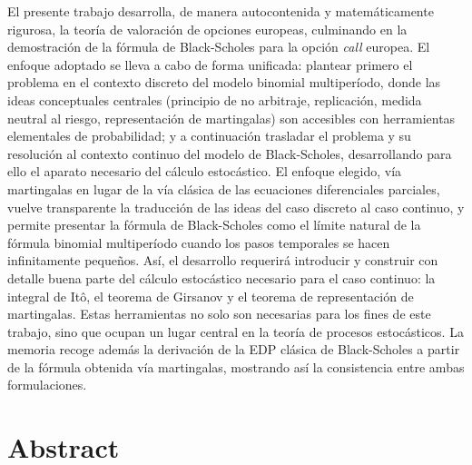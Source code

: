 \documentclass[11pt,a4paper,oneside]{report}
\theoremstyle{plain}
\theoremstyle{definition}
\theoremstyle{remark}
\newcommand{\1}{\mathbf{1}}
\begin{document}
\itshape

El presente trabajo desarrolla, de manera autocontenida y matemáticamente
rigurosa, la teoría de valoración de opciones europeas, culminando en
la demostración de la fórmula de Black-Scholes para la opción
\emph{call} europea. El enfoque adoptado se lleva a cabo de forma unificada:
plantear primero el problema en el contexto discreto del modelo
binomial multiperíodo, donde las ideas conceptuales centrales
(principio de no arbitraje, replicación, medida neutral al riesgo,
representación de martingalas) son accesibles con herramientas
elementales de probabilidad; y a continuación trasladar el problema y
su resolución al contexto continuo del modelo de Black-Scholes,
desarrollando para ello el aparato necesario del cálculo estocástico.
El enfoque elegido, vía martingalas en lugar de la vía clásica
de las ecuaciones diferenciales parciales, vuelve transparente la
traducción de las ideas del caso discreto al caso continuo, y permite
presentar la fórmula de Black-Scholes como el límite natural de la
fórmula binomial multiperíodo cuando los pasos temporales se hacen
infinitamente pequeños. Así, el desarrollo requerirá introducir y construir con detalle buena parte del cálculo estocástico necesario para el caso continuo: la integral de Itô, el teorema de Girsanov y el teorema de representación de martingalas. Estas herramientas no solo son necesarias para los fines de este trabajo, sino que ocupan un lugar central en la teoría de procesos estocásticos. La memoria recoge además la derivación de la
EDP clásica de Black-Scholes a partir de la fórmula obtenida vía martingalas, mostrando así
la consistencia entre ambas formulaciones. 

\upshape

\vspace{0.25cm}

\section*{Abstract}

\itshape
\end{document}
